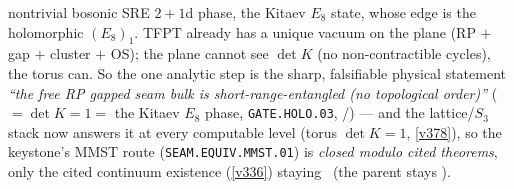 \begin{keybox}
nontrivial bosonic SRE $2{+}1$d phase, the Kitaev $E_8$ state, whose edge is the holomorphic $(E_8)_1$. TFPT
already has a unique vacuum on the plane (RP $+$ gap $+$ cluster $+$ OS); the plane cannot see $\det K$ (no
non-contractible cycles), the torus can. So the one analytic step is the sharp, falsifiable physical
statement \emph{``the free RP gapped seam bulk is short-range-entangled (no topological order)''}
($=\det K=1=$ the Kitaev $E_8$ phase, \texttt{GATE.HOLO.03}, \mE/\mC) --- and the lattice/$S_3$ stack now answers
it at every computable level (torus $\det K{=}1$, \vref{v378}), so the keystone's MMST route
(\texttt{SEAM.EQUIV.MMST.01}) is \emph{closed modulo cited
theorems}, only the cited continuum existence (\vref{v336}) staying \mO\ (the parent stays \mO).
\end{keybox}

